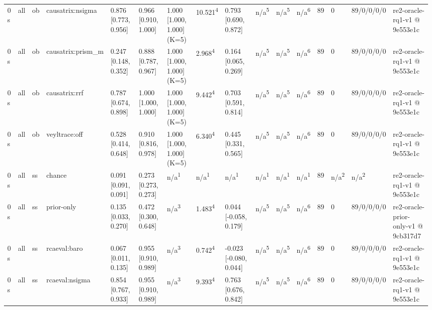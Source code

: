 \begin{table}[t]
\begin{tabular}{llllllllllllllll}
0 s & all & ob & causatrix:nsigma & 0.876 [0.773, 0.956] & 0.966 [0.910, 1.000] & 1.000 [1.000, 1.000] (K=5) & 10.521\textsuperscript{4} & 0.793 [0.690, 0.872] & n/a\textsuperscript{5} & n/a\textsuperscript{5} & n/a\textsuperscript{6} & 89 & 0 & 89/0/0/0/0 & re2-oracle-rq1-v1 @ 9e553e1c \\
0 s & all & ob & causatrix:prism\_m & 0.247 [0.148, 0.352] & 0.888 [0.787, 0.967] & 1.000 [1.000, 1.000] (K=5) & 2.968\textsuperscript{4} & 0.164 [0.065, 0.269] & n/a\textsuperscript{5} & n/a\textsuperscript{5} & n/a\textsuperscript{6} & 89 & 0 & 89/0/0/0/0 & re2-oracle-rq1-v1 @ 9e553e1c \\
0 s & all & ob & causatrix:rrf & 0.787 [0.674, 0.898] & 1.000 [1.000, 1.000] & 1.000 [1.000, 1.000] (K=5) & 9.442\textsuperscript{4} & 0.703 [0.591, 0.814] & n/a\textsuperscript{5} & n/a\textsuperscript{5} & n/a\textsuperscript{6} & 89 & 0 & 89/0/0/0/0 & re2-oracle-rq1-v1 @ 9e553e1c \\
0 s & all & ob & veyltrace:off & 0.528 [0.414, 0.648] & 0.910 [0.816, 0.978] & 1.000 [1.000, 1.000] (K=5) & 6.340\textsuperscript{4} & 0.445 [0.331, 0.565] & n/a\textsuperscript{5} & n/a\textsuperscript{5} & n/a\textsuperscript{6} & 89 & 0 & 89/0/0/0/0 & re2-oracle-rq1-v1 @ 9e553e1c \\
0 s & all & ss & chance & 0.091 [0.091, 0.091] & 0.273 [0.273, 0.273] & n/a\textsuperscript{1} & n/a\textsuperscript{1} & n/a\textsuperscript{1} & n/a\textsuperscript{1} & n/a\textsuperscript{1} & n/a\textsuperscript{1} & 89 & n/a\textsuperscript{2} & n/a\textsuperscript{2} & re2-oracle-rq1-v1 @ 9e553e1c \\
0 s & all & ss & prior-only & 0.135 [0.033, 0.270] & 0.472 [0.300, 0.648] & n/a\textsuperscript{3} & 1.483\textsuperscript{4} & 0.044 [-0.058, 0.179] & n/a\textsuperscript{5} & n/a\textsuperscript{5} & n/a\textsuperscript{6} & 89 & 0 & 89/0/0/0/0 & re2-oracle-prior-only-v1 @ 9cb317d7 \\
0 s & all & ss & rcaeval:baro & 0.067 [0.011, 0.135] & 0.955 [0.910, 0.989] & n/a\textsuperscript{3} & 0.742\textsuperscript{4} & -0.023 [-0.080, 0.044] & n/a\textsuperscript{5} & n/a\textsuperscript{5} & n/a\textsuperscript{6} & 89 & 0 & 89/0/0/0/0 & re2-oracle-rq1-v1 @ 9e553e1c \\
0 s & all & ss & rcaeval:nsigma & 0.854 [0.767, 0.933] & 0.955 [0.910, 0.989] & n/a\textsuperscript{3} & 9.393\textsuperscript{4} & 0.763 [0.676, 0.842] & n/a\textsuperscript{5} & n/a\textsuperscript{5} & n/a\textsuperscript{6} & 89 & 0 & 89/0/0/0/0 & re2-oracle-rq1-v1 @ 9e553e1c \\

\end{tabular}
\end{table}
